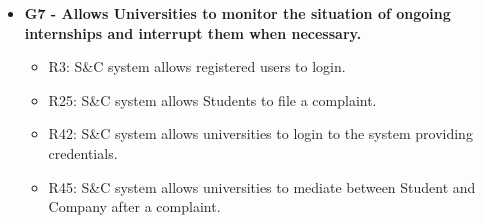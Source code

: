 \begin{itemize}
    
    \item \textbf{G7 - Allows Universities to monitor the situation of ongoing internships and interrupt them when necessary.}
    \begin{itemize}
        \item R3: S\&C system allows registered users to login.
        \item R25: S\&C system allows Students to file a complaint.
        \item R42: S\&C system allows universities to login to the system providing credentials.
        \item R45: S\&C system allows universities to mediate between Student and Company after a complaint.
    \end{itemize}
\end{itemize}

\clearpage

